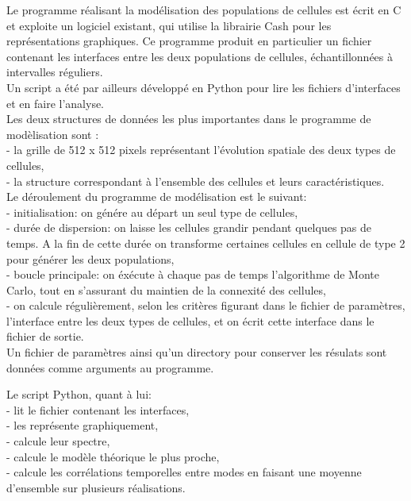\documentclass[11pt,a4paper]{article}
\begin{document}
Le programme réalisant la modélisation des populations de cellules est écrit en C et exploite un logiciel existant, qui utilise la librairie Cash pour les représentations graphiques. Ce programme produit en particulier un fichier contenant les interfaces entre les deux populations de cellules, échantillonnées à intervalles réguliers.\\

Un script a été par ailleurs développé en Python pour lire les fichiers d'interfaces et en faire l'analyse.\\

Les deux structures de données les plus importantes dans le programme de modèlisation sont :\\
- la grille de 512 x 512 pixels représentant l'évolution spatiale des deux types de cellules,\\
- la structure correspondant à l'ensemble des cellules et leurs caractéristiques.\\

Le déroulement du programme de modélisation est le suivant:\\
- initialisation: on génére au départ un seul type de cellules,  \\
- durée de dispersion: on laisse les cellules grandir pendant quelques pas de temps. A la fin de cette durée on transforme certaines cellules en cellule de type 2 pour générer les deux populations, \\
- boucle principale: on éxécute à chaque pas de temps l'algorithme de Monte Carlo, tout en s'assurant du maintien de la connexité des cellules, \\
- on calcule régulièrement, selon les critères figurant dans le fichier de paramètres, l'interface entre les deux types de cellules, et on écrit cette interface dans le fichier de sortie.\\

Un fichier de paramètres ainsi qu'un directory pour conserver les résulats sont données comme arguments au programme.

Le script Python, quant à lui: \\
- lit le fichier contenant les interfaces,\\
- les représente graphiquement,\\
- calcule leur spectre,\\
- calcule le modèle théorique le plus proche,\\
- calcule les corrélations temporelles entre modes en faisant une moyenne d'ensemble sur plusieurs réalisations.\\
\end{document}
